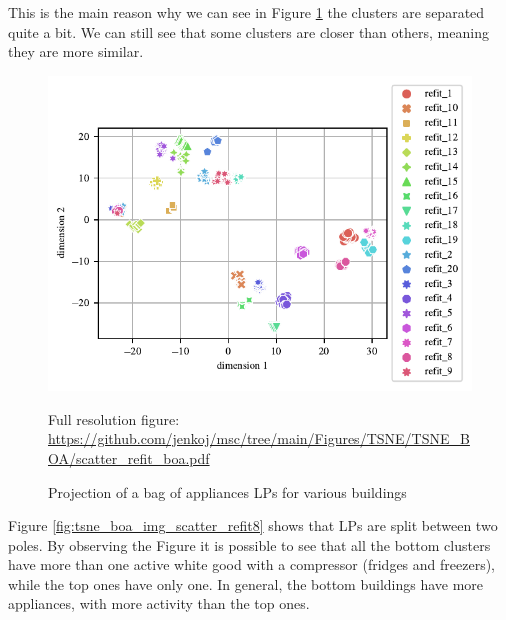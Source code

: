 This is the main reason why we can see in Figure \ref{fig:tsne_boa_scatter_refit8} the clusters are separated quite a bit.
We can still see that some clusters are closer than others,
meaning they are more similar.  

\begin{figure}[H]
	\centering
	\caption{Projection of a bag of appliances LPs for various buildings}
	\includegraphics[]{Figures/TSNE/TSNE_BOA/scatter_refit_boa.pdf}
	\label{fig:tsne_boa_scatter_refit8}
	\par
	\par\footnotesize{Full resolution figure: \url{https://github.com/jenkoj/msc/tree/main/Figures/TSNE/TSNE_BOA/scatter_refit_boa.pdf}}
\end{figure} 

Figure \ref{fig:tsne_boa_img_scatter_refit8} shows that LPs are split 
between two poles. 
By observing the Figure it is possible to see that all the bottom clusters
have more than one active white good with a compressor (fridges and freezers), while
the top ones have only one. In general, the bottom buildings have more appliances,
with more activity than the top ones. 

